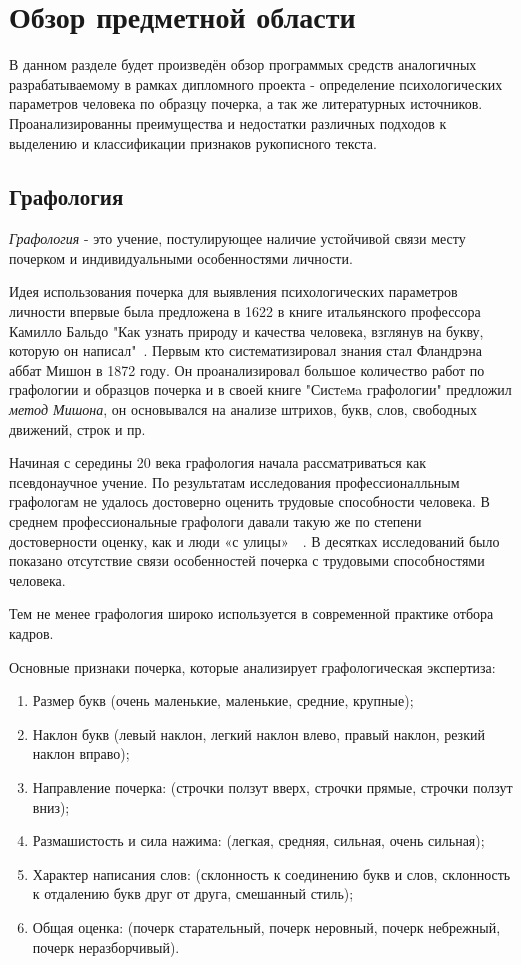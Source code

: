 \section{Обзор предметной области}
\label{sec:domain:intro}

В данном разделе будет произведён обзор программых средств аналогичных разрабатываемому в рамках дипломного проекта - определение психологических параметров человека по образцу почерка, а так же литературных источников. Проанализированны преимущества и недостатки различных подходов к выделению и классификации признаков рукописного текста.

\subsection{Графология}
\label{sub:domain:grafologic}
\emph{Графология} - это учение, постулирующее наличие устойчивой связи месту почерком и индивидуальными особенностями личности.

Идея использования почерка для выявления психологических параметров личности впервые была предложена в 1622 в книге итальянского профессора Камилло Бальдо "Как узнать природу и качества человека, взглянув на букву, которую он написал"~\cite{kamillo_grafology}. Первым кто систематизировал знания стал Фландрэна аббат Мишон в 1872 году. Он проанализировал большое количество работ по графологии и образцов почерка и в своей книге "Систeмa графологии" предложил \emph{метод Мишона}, он основывался на анализе штрихов, букв, слов, свободных движений, строк и пр.~\cite{mishon_grafology}

Начиная с середины 20 века графология начала рассматриваться как псевдонаучное учение. По результатам исследования профессионалльным графологам не удалось достоверно оценить трудовые способности человека. В среднем профессиональные графологи давали такую же по степени достоверности оценку, как и люди «с улицы»~\cite{neter_shakhar_psevdograph}~\cite{neter_shakhar_psevdograph}. В десятках исследований было показано отсутствие связи особенностей почерка с трудовыми способностями человека.

Тем не менее графология широко используется в современной практике отбора кадров.

Основные признаки почерка, которые анализирует графологическая экспертиза:
\begin{enumerate}
  \item Размер букв (очень маленькие, маленькие, средние, крупные);
  \item Наклон букв (левый наклон, легкий наклон влево, правый наклон, резкий наклон вправо);
  \item Направление почерка: (строчки ползут вверх, строчки прямые,  строчки ползут вниз);
  \item Размашистость и сила нажима: (легкая, средняя, сильная, очень сильная);
  \item Характер написания слов: (склонность к соединению букв и слов, склонность к отдалению букв друг от друга, смешанный стиль);
  \item Общая оценка: (почерк старательный, почерк неровный, почерк небрежный, почерк неразборчивый).
\end{enumerate}

